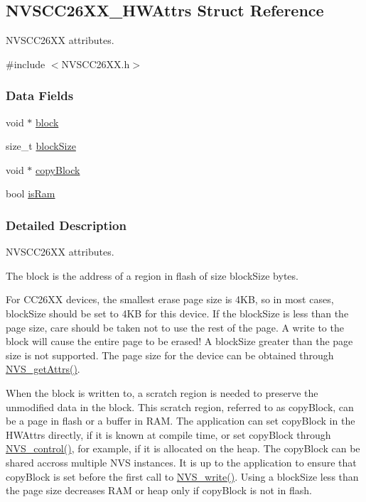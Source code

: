 \subsection{N\+V\+S\+C\+C26\+X\+X\+\_\+\+H\+W\+Attrs Struct Reference}
\label{struct_n_v_s_c_c26_x_x___h_w_attrs}


N\+V\+S\+C\+C26\+X\+X attributes.  




{\ttfamily \#include $<$N\+V\+S\+C\+C26\+X\+X.\+h$>$}

\subsubsection*{Data Fields}
\begin{DoxyCompactItemize}
\item 
void $\ast$ \hyperlink{struct_n_v_s_c_c26_x_x___h_w_attrs_ab2e63975579a87dcf24b3a18b04bc479}{block}
\item 
size\+\_\+t \hyperlink{struct_n_v_s_c_c26_x_x___h_w_attrs_aed65c7ea3cd519eb9d9736d27e38088c}{block\+Size}
\item 
void $\ast$ \hyperlink{struct_n_v_s_c_c26_x_x___h_w_attrs_a223a3b1a3e5b2fbf51eb913ecc2ec018}{copy\+Block}
\item 
bool \hyperlink{struct_n_v_s_c_c26_x_x___h_w_attrs_a4cec181505b26bbbacabf9c021189c95}{is\+Ram}
\end{DoxyCompactItemize}


\subsubsection{Detailed Description}
N\+V\+S\+C\+C26\+X\+X attributes. 

The block is the address of a region in flash of size block\+Size bytes.

For C\+C26\+X\+X devices, the smallest erase page size is 4\+K\+B, so in most cases, block\+Size should be set to 4\+K\+B for this device. If the block\+Size is less than the page size, care should be taken not to use the rest of the page. A write to the block will cause the entire page to be erased! A block\+Size greater than the page size is not supported. The page size for the device can be obtained through \hyperlink{_n_v_s_8h_a6b92f45097f377824524f7a4f33f02b1}{N\+V\+S\+\_\+get\+Attrs()}.

When the block is written to, a scratch region is needed to preserve the unmodified data in the block. This scratch region, referred to as copy\+Block, can be a page in flash or a buffer in R\+A\+M. The application can set copy\+Block in the H\+W\+Attrs directly, if it is known at compile time, or set copy\+Block through \hyperlink{_n_v_s_8h_adb26bd05e4f063191411ac5ad968b1d9}{N\+V\+S\+\_\+control()}, for example, if it is allocated on the heap. The copy\+Block can be shared accross multiple N\+V\+S instances. It is up to the application to ensure that copy\+Block is set before the first call to \hyperlink{_n_v_s_8h_a2c0acbdec0a65dc725019adb65ad282a}{N\+V\+S\+\_\+write()}. Using a block\+Size less than the page size decreases R\+A\+M or heap only if copy\+Block is not in flash. 

